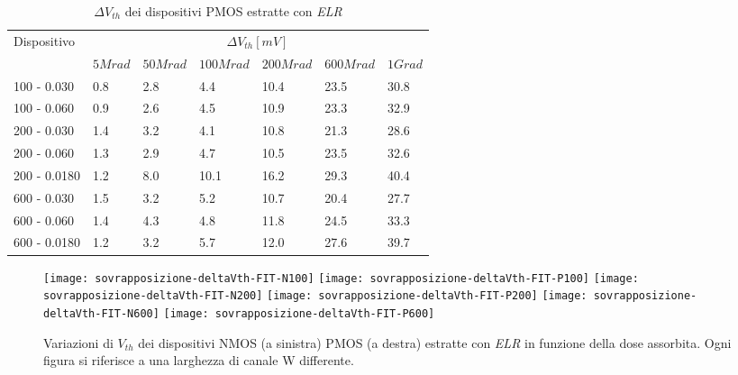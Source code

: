 \begin{table}[H]
  \renewcommand{\arraystretch}{1.3}
  \begin{tabular}{m{2.1cm}  m{1.1cm} m{1.3cm} m{1.5cm} m{1.5cm} m{1.5cm} m{1cm}}
    \toprule
    \multirow{2}{*}{Dispositivo} & \multicolumn{6}{c}{$\Delta V_{th} [mV] $}                                                          \\
    \cmidrule{2-7}
                                 & $5Mrad$                                   & $50Mrad$ & $100Mrad$ & $200Mrad$ & $600Mrad$ & $1Grad$ \\
    \midrule
    100 - 0.030                     & 0.8                                       & 2.8      & 4.4       & 10.4      & 23.5      & 30.8    \\
    \hline
    100 - 0.060                     & 0.9                                       & 2.6      & 4.5       & 10.9      & 23.3      & 32.9    \\
    \hline
    200 - 0.030                     & 1.4                                       & 3.2      & 4.1       & 10.8      & 21.3      & 28.6    \\
    \hline
    200 - 0.060                     & 1.3                                       & 2.9      & 4.7       & 10.5      & 23.5      & 32.6    \\
    \hline
    200 - 0.0180                    & 1.2                                       & 8.0      & 10.1      & 16.2      & 29.3      & 40.4    \\
    \hline
    600 - 0.030                     & 1.5                                       & 3.2      & 5.2       & 10.7      & 20.4      & 27.7    \\
    \hline
    600 - 0.060                     & 1.4                                       & 4.3      & 4.8       & 11.8      & 24.5      & 33.3    \\
    \hline
    600 - 0.0180                    & 1.2                                       & 3.2      & 5.7       & 12.0      & 27.6      & 39.7    \\
    \bottomrule
  \end{tabular}
  \caption{$\Delta V_{th}$ dei dispositivi PMOS estratte con \emph{ELR}}
  \label{tab:deltaVthELRP}
\end{table}

\begin{figure}[H]
  \centering
  \texttt{[image: sovrapposizione-deltaVth-FIT-N100]}
  \texttt{[image: sovrapposizione-deltaVth-FIT-P100]}
  \texttt{[image: sovrapposizione-deltaVth-FIT-N200]}
  \texttt{[image: sovrapposizione-deltaVth-FIT-P200]}
  \texttt{[image: sovrapposizione-deltaVth-FIT-N600]}
  \texttt{[image: sovrapposizione-deltaVth-FIT-P600]}
  \caption{Variazioni di $V_{th}$ dei dispositivi NMOS (a sinistra) PMOS (a destra) estratte con \emph{ELR} in funzione della dose assorbita. Ogni figura si riferisce a una larghezza di canale W differente.}
\end{figure}

